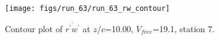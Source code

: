 \begin{figure}[H]
\centering
\texttt{[image: figs/run\_63/run\_63\_rw\_contour]}
\caption{Contour plot of $\overline{r^\prime w^\prime}$ at $z/c$=10.00, $V_{free}$=19.1, station 7.}
\end{figure}


